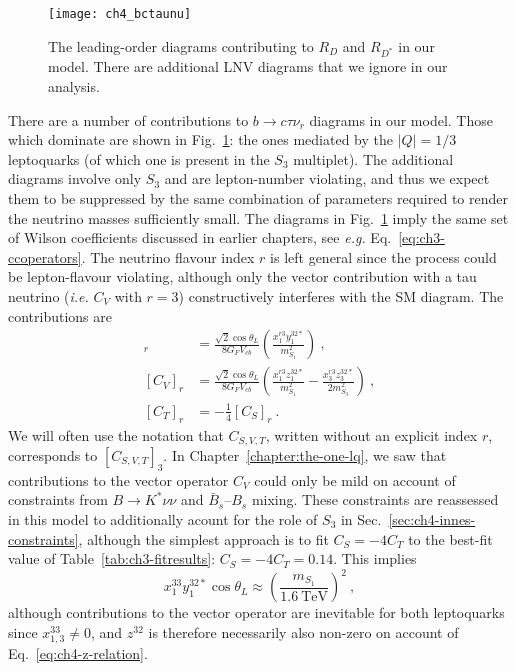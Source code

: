 \begin{figure}[t]
  \centering
  \texttt{[image: ch4\_bctaunu]}
  \caption[The leading-order diagrams contributing to $R_{D}$ and $R_{D^{*}}$ in
  our model.]{The leading-order diagrams contributing to $R_{D}$ and $R_{D^{*}}$
    in our model. There are additional LNV diagrams that we ignore in our
    analysis.}
  \label{fig:ch4-bctaunu-diags}
\end{figure}

There are a number of contributions to $b \to c \tau \nu_{r}$ diagrams in our
model. Those which dominate are shown in Fig.~\ref{fig:ch4-bctaunu-diags}: the
ones mediated by the $|Q| = 1/3$ leptoquarks (of which one is present in the
$S_{3}$ multiplet). The additional diagrams involve only $S_{3}$ and are
lepton-number violating, and thus we expect them to be suppressed by the same
combination of parameters required to render the neutrino masses sufficiently
small. The diagrams in Fig.~\ref{fig:ch4-bctaunu-diags} imply the same set of
Wilson coefficients discussed in earlier chapters, see \textit{e.g.}
Eq.~\eqref{eq:ch3-ccoperators}. The neutrino flavour index $r$ is left general
since the process could be lepton-flavour violating, although only the vector
contribution with a tau neutrino (\textit{i.e.} $C_{V}$ with $r = 3$)
constructively interferes with the SM diagram. The contributions are
\begin{align}
[{C}_{S}]_{r} &= \frac{\sqrt{2}\cos \theta_L}{8 G_F V_{cb}} \left( \frac{x^{r3}_{1} y^{32*}_{1}}{m_{S_{1}}^2} \right) \ , \label{eq:ch4-csl} \\
[{C}_{V}]_{r} &= \frac{\sqrt{2}\cos \theta_{L}}{8 G_F V_{cb}} \left(\frac{x^{r3}_{1} z^{32*}_{1}}{m_{S_{1}}^2} - \frac{x_{3}^{r3} z_{3}^{32*}}{2 m_{S_{3}}^2} \right) \ , \label{eq:ch4-cvl} \\
[{C}_{T}]_{r} &=-\frac{1}{4} [C_{S}]_{r} \ . \label{eq:ch4-ct}
\end{align}
We will often use the notation that $C_{S,V,T}$, written without an explicit
index $r$, corresponds to $[C_{S,V,T}]_{3}$. In
Chapter~\ref{chapter:the-one-lq}, we saw that contributions to the vector
operator $C_{V}$ could only be mild on account of constraints from
$B \to K^{*}\nu\nu$ and $\bar{B}_{s}$--$B_{s}$ mixing. These constraints are
reassessed in this model to additionally acount for the role of $S_{3}$ in
Sec.~\ref{sec:ch4-innes-constraints}, although the simplest approach is to fit
$C_{S} = -4 C_{T}$ to the best-fit value of Table~\ref{tab:ch3-fitresults}:
$C_{S} = -4 C_{T} = 0.14$. This implies
\begin{equation}
  x_{1}^{33} y_{1}^{32*} \cos \theta_{L} \approx \left( \frac{m_{S_{1}}}{\SI{1.6}{\TeV}} \right)^{2} \ ,
\end{equation}
although contributions to the vector operator are inevitable for both
leptoquarks since $x_{1,3}^{33} \neq 0$, and $z^{32}$ is therefore necessarily
also non-zero on account of Eq.~\eqref{eq:ch4-z-relation}.


